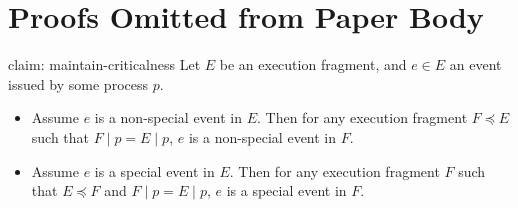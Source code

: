 
\section{Proofs Omitted from Paper Body}

\begin{claim-repeat} {claim: maintain-criticalness}
		Let $E$ be an execution fragment, and $e \in E$ an event issued by some process $p$.
		\begin{itemize}
			\item Assume $e$ is a non-special event in $E$. Then for any execution fragment $F \preceq E$ such that $F \mid p = E \mid p$, $e$ is a non-special event in $F$.
			\item Assume $e$ is a special event in $E$. Then for any execution fragment $F$ such that $E \preceq F$ and $F \mid p = E \mid p$, $e$ is a special event in $F$.
		\end{itemize}
\end{claim-repeat}

